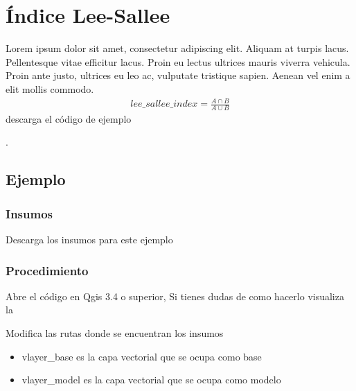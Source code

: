\documentclass[letterpaper,10pt,spanish]{sphinxmanual}
\begin{document}
\chapter{Índice Lee-Sallee}
\label{\detokenize{leesallee:indice-lee-sallee}}\label{\detokenize{leesallee::doc}}
Lorem ipsum dolor sit amet, consectetur adipiscing elit.
Aliquam at turpis lacus. Pellentesque vitae efficitur lacus.
Proin eu lectus ultrices mauris viverra vehicula. Proin ante justo,
ultrices eu leo ac, vulputate tristique sapien. Aenean vel enim a elit mollis commodo.
\begin{equation*}
\begin{split}lee\_sallee\_index =  \frac{A\cap B}{A\cup B}\end{split}
\end{equation*}
descarga el código de ejemplo

.


\section{Ejemplo}
\label{\detokenize{leesallee:ejemplo}}

\subsection{Insumos}
\label{\detokenize{leesallee:insumos}}
Descarga los insumos para este ejemplo 


\subsection{Procedimiento}
\label{\detokenize{leesallee:procedimiento}}
Abre el código  en Qgis 3.4 o superior,
Si tienes dudas de como hacerlo visualiza la 

Modifica las rutas donde se encuentran los insumos
\begin{itemize}
\item {} 
vlayer\_base es la capa vectorial que se ocupa como base

\item {} 
vlayer\_model es la capa vectorial que se ocupa como modelo

\end{itemize}

\noindent{}
\label{\detokenize{leesallee:module-indice_lee_sallee}}
\end{document}
